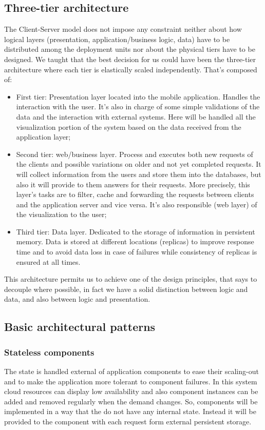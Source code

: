 \subsection{Three-tier architecture}
The Client-Server model does not impose any constraint neither about how logical layers (presentation, application/business logic, data) have to be distributed among the deployment units nor about the physical tiers have to be designed.
We taught that the best decision for us could have been the three-tier architecture where each tier is elastically scaled independently. 
That’s composed of:
\begin{itemize}
\item	First tier: Presentation layer located into the mobile application. Handles the interaction with the user. It’s also in charge of some simple validations of the data and the interaction with external systems. Here will be handled all the visualization portion of the system based on the data received from the application layer;
\item	Second tier: web/business layer. Process and executes both new requests of the clients and possible variations on older and not yet completed requests. It will collect information from the users and store them into the databases, but also it will provide to them answers for their requests. 
More precisely, this layer’s tasks are to filter, cache and forwarding the requests between clients and the application server and vice versa. 
It’s also responsible (web layer) of the visualization to the user;
\item	Third tier: Data layer. Dedicated to the storage of information in persistent memory. Data is stored at different locations (replicas) to improve response time and to avoid data loss in case of failures while consistency of replicas is ensured at all times.
\end{itemize}
This architecture permits us to achieve one of the design principles, that says to decouple where possible, in fact we have a solid distinction between logic and data, and also between logic and presentation.

\subsection{Basic architectural patterns}

\subsubsection{Stateless components}
The state is handled external of application components to ease their scaling-out and to make the application more tolerant to component failures. 
In this system cloud resources can display low availability and also component instances can be added and removed regularly when the demand changes.
So, components will be implemented in a way that the do not have any internal state. Instead it will be provided to the component with each request form external persistent storage.

